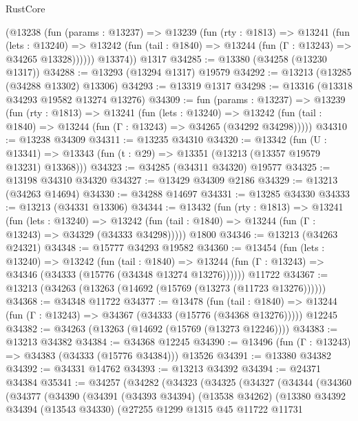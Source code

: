 \begin{lexlean}{RustCore}
\begin{coremodule}
        (@13238
          (fun (params : @13237) =>
          @13239
            (fun (rty : @1813) =>
            @13241
              (fun (lets : @13240) =>
              @13242 (fun (tail : @1840) => @13244 (fun (Γ : @13243) => @34265 @13328))))))
        @13374))
    @1317
@34285 := @13380 (@34258 (@13230 @1317))
@34288 := @13293 (@13294 @1317) @19579
@34292 := @13213 (@13285 (@34288 @13302) @13306)
@34293 := @13319 @1317
@34298 := @13316 (@13318 @34293 @19582 @13274 @13276)
@34309 := fun (params : @13237) =>
  @13239
    (fun (rty : @1813) =>
    @13241
      (fun (lets : @13240) =>
      @13242 (fun (tail : @1840) => @13244 (fun (Γ : @13243) => @34265 (@34292 @34298)))))
@34310 := @13238 @34309
@34311 := @13235 @34310
@34320 := @13342
    (fun (U : @13341) => @13343 (fun (t : @29) => @13351 (@13213 (@13357 @19579 @13231) @13368)))
@34323 := @34285 (@34311 @34320) @19577
@34325 := @13198 @34310 @34320
@34327 := @13429 @34309 @2186
@34329 := @13213 (@34263 @14694)
@34330 := @34288 @14697
@34331 := @13285 @34330
@34333 := @13213 (@34331 @13306)
@34344 := @13432
    (fun (rty : @1813) =>
    @13241
      (fun (lets : @13240) =>
      @13242 (fun (tail : @1840) => @13244 (fun (Γ : @13243) => @34329 (@34333 @34298)))))
    @1800
@34346 := @13213 (@34263 @24321)
@34348 := @15777 @34293 @19582
@34360 := @13454
    (fun (lets : @13240) =>
    @13242
      (fun (tail : @1840) =>
      @13244 (fun (Γ : @13243) => @34346 (@34333 (@15776 (@34348 @13274 @13276))))))
    @11722
@34367 := @13213 (@34263 (@13263 (@14692 (@15769 (@13273 (@11723 @13276))))))
@34368 := @34348 @11722
@34377 := @13478
    (fun (tail : @1840) => @13244 (fun (Γ : @13243) => @34367 (@34333 (@15776 (@34368 @13276)))))
    @12245
@34382 := @34263 (@13263 (@14692 (@15769 (@13273 @12246))))
@34383 := @13213 @34382
@34384 := @34368 @12245
@34390 := @13496 (fun (Γ : @13243) => @34383 (@34333 (@15776 @34384))) @13526
@34391 := @13380 @34382
@34392 := @34331 @14762
@34393 := @13213 @34392
@34394 := @24371 @34384
@35341 := @34257
    (@34282
      (@34323
        (@34325
          (@34327
            (@34344
              (@34360
                (@34377
                  (@34390
                    (@34391
                      (@34393 @34394)
                      (@13538 @34262)
                      (@13380
                        @34392
                        @34394
                        (@13543 @34330)
                        (@27255
                          @1299
                          @1315
                          @45
                          @11722
                          @11731

\end{coremodule}
\end{lexlean}
